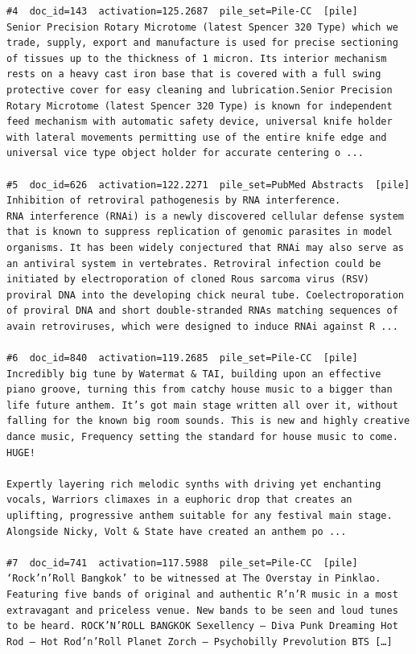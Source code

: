 \begin{verbatim}
#4  doc_id=143  activation=125.2687  pile_set=Pile-CC  [pile]
Senior Precision Rotary Microtome (latest Spencer 320 Type) which we trade, supply, export and manufacture is used for precise sectioning of tissues up to the thickness of 1 micron. Its interior mechanism rests on a heavy cast iron base that is covered with a full swing protective cover for easy cleaning and lubrication.Senior Precision Rotary Microtome (latest Spencer 320 Type) is known for independent feed mechanism with automatic safety device, universal knife holder with lateral movements permitting use of the entire knife edge and universal vice type object holder for accurate centering o ...

#5  doc_id=626  activation=122.2271  pile_set=PubMed Abstracts  [pile]
Inhibition of retroviral pathogenesis by RNA interference.
RNA interference (RNAi) is a newly discovered cellular defense system that is known to suppress replication of genomic parasites in model organisms. It has been widely conjectured that RNAi may also serve as an antiviral system in vertebrates. Retroviral infection could be initiated by electroporation of cloned Rous sarcoma virus (RSV) proviral DNA into the developing chick neural tube. Coelectroporation of proviral DNA and short double-stranded RNAs matching sequences of avain retroviruses, which were designed to induce RNAi against R ...

#6  doc_id=840  activation=119.2685  pile_set=Pile-CC  [pile]
Incredibly big tune by Watermat & TAI, building upon an effective piano groove, turning this from catchy house music to a bigger than life future anthem. It’s got main stage written all over it, without falling for the known big room sounds. This is new and highly creative dance music, Frequency setting the standard for house music to come. HUGE!

Expertly layering rich melodic synths with driving yet enchanting vocals, Warriors climaxes in a euphoric drop that creates an uplifting, progressive anthem suitable for any festival main stage. Alongside Nicky, Volt & State have created an anthem po ...

#7  doc_id=741  activation=117.5988  pile_set=Pile-CC  [pile]
‘Rock’n’Roll Bangkok’ to be witnessed at The Overstay in Pinklao. Featuring five bands of original and authentic R’n’R music in a most extravagant and priceless venue. New bands to be seen and loud tunes to be heard. ROCK’N’ROLL BANGKOK Sexellency – Diva Punk Dreaming Hot Rod – Hot Rod’n’Roll Planet Zorch – Psychobilly Prevolution BTS […]


\end{verbatim}
